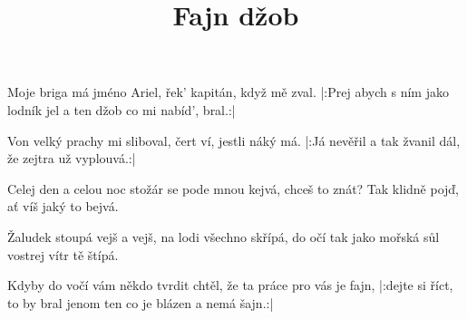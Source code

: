 \beginsong

\title{Fajn džob}

\beginverse
Moje briga má jméno Ariel,
řek' kapitán, když mě zval.
|:Prej abych s ním jako lodník jel
a ten džob co mi nabíd', bral.:|
\endverse

\beginverse
Von velký prachy mi sliboval,
čert ví, jestli náký má.
|:Já nevěřil a tak žvanil dál,
že zejtra už vyplouvá.:|
\endverse

\beginrefrain
{}Celej den a celou noc
stožár se pode mnou kejvá,
chceš to znát? Tak klidně pojď,
ať víš jaký to bejvá.

Žaludek stoupá vejš a vejš,
na lodi všechno skřípá,
do očí tak jako mořská sůl
vostrej vítr tě štípá.
\endrefrain

\beginverse
Kdyby do vočí vám někdo tvrdit chtěl,
že ta práce pro vás je fajn,
|:dejte si říct, to by bral jenom ten
co je blázen a nemá šajn.:|
\endverse



